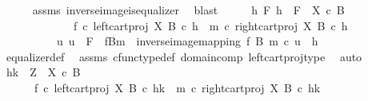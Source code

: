 \begin{isabellebody}
\ \ \ \ \isamarkupfalse%
\ assms\ inverse{\isacharunderscore}{\kern0pt}image{\isacharunderscore}{\kern0pt}is{\isacharunderscore}{\kern0pt}equalizer{}\ \isamarkupfalse%
\ blast\isanewline
\ \ \isamarkupfalse%
\ \isamarkupfalse%
\ {\isachardoublequoteopen}{\isasymforall}h\ F{\isachardot}{\kern0pt}\ h\ {\isacharcolon}{\kern0pt}\ F\ {\isasymrightarrow}\ {\isacharparenleft}{\kern0pt}X\ {\isasymtimes}\isactrlsub c\ B{\isacharparenright}{\kern0pt}\ \isanewline
\ \ \ \ \ \ \ \ \ \ \ \ {\isasymand}\ {\isacharparenleft}{\kern0pt}f\ {\isasymcirc}\isactrlsub c\ left{\isacharunderscore}{\kern0pt}cart{\isacharunderscore}{\kern0pt}proj\ X\ B{\isacharparenright}{\kern0pt}\ {\isasymcirc}\isactrlsub c\ h\ {\isacharequal}{\kern0pt}\ {\isacharparenleft}{\kern0pt}m\ {\isasymcirc}\isactrlsub c\ right{\isacharunderscore}{\kern0pt}cart{\isacharunderscore}{\kern0pt}proj\ X\ B{\isacharparenright}{\kern0pt}\ {\isasymcirc}\isactrlsub c\ h\ {\isasymlongrightarrow}\isanewline
\ \ \ \ \ \ \ \ \ \ {\isacharparenleft}{\kern0pt}{\isasymexists}{\isacharbang}{\kern0pt}u{\isachardot}{\kern0pt}\ u\ {\isacharcolon}{\kern0pt}\ F\ {\isasymrightarrow}\ {\isacharparenleft}{\kern0pt}f\isactrlsup {\isacharminus}{\kern0pt}B{\isasymrparr}\isactrlbsub m\isactrlesub {\isacharparenright}{\kern0pt}\ {\isasymand}\ inverse{\isacharunderscore}{\kern0pt}image{\isacharunderscore}{\kern0pt}mapping\ f\ B\ m\ {\isasymcirc}\isactrlsub c\ u\ {\isacharequal}{\kern0pt}\ h{\isacharparenright}{\kern0pt}{\isachardoublequoteclose}\isanewline
\ \ \ \ \isamarkupfalse%
\ equalizer{\isacharunderscore}{\kern0pt}def\ \isamarkupfalse%
\ assms{\isacharparenleft}{\kern0pt}{}{\isacharparenright}{\kern0pt}\ cfunc{\isacharunderscore}{\kern0pt}type{\isacharunderscore}{\kern0pt}def\ domain{\isacharunderscore}{\kern0pt}comp\ left{\isacharunderscore}{\kern0pt}cart{\isacharunderscore}{\kern0pt}proj{\isacharunderscore}{\kern0pt}type\ \isamarkupfalse%
\ auto\isanewline
\ \ \isamarkupfalse%
\ \isamarkupfalse%
\ {\isachardoublequoteopen}{\isasymlangle}h{\isacharcomma}{\kern0pt}k{\isasymrangle}\ {\isacharcolon}{\kern0pt}\ Z\ {\isasymrightarrow}\ X\ {\isasymtimes}\isactrlsub c\ B\ \ {\isasymLongrightarrow}\isanewline
\ \ \ \ \ \ {\isacharparenleft}{\kern0pt}f\ {\isasymcirc}\isactrlsub c\ left{\isacharunderscore}{\kern0pt}cart{\isacharunderscore}{\kern0pt}proj\ X\ B{\isacharparenright}{\kern0pt}\ {\isasymcirc}\isactrlsub c\ {\isasymlangle}h{\isacharcomma}{\kern0pt}k{\isasymrangle}\ {\isacharequal}{\kern0pt}\ {\isacharparenleft}{\kern0pt}m\ {\isasymcirc}\isactrlsub c\ right{\isacharunderscore}{\kern0pt}cart{\isacharunderscore}{\kern0pt}proj\ X\ B{\isacharparenright}{\kern0pt}\ {\isasymcirc}\isactrlsub c\ {\isasymlangle}h{\isacharcomma}{\kern0pt}k{\isasymrangle}\ {\isasymLongrightarrow}\isanewline

\end{isabellebody}
